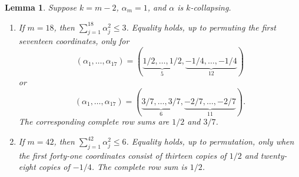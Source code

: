 \documentclass[10pt]{article}
\newtheorem{lemma}{Lemma}
\begin{document}
\begin{lemma}\label{lem:scalar}
Suppose $k=m-2$, $\alpha_m=1$, and $\alpha$ is $k$-collapsing.
\begin{enumerate}
\item If $m=18$, then $\sum_{j=1}^{18}\alpha_j^2\le3$. Equality holds,
up to permuting the first seventeen coordinates, only for
\[
 (\alpha_1,\ldots,\alpha_{17})
 = (\underbrace{1/2,\ldots,1/2}_{5},
    \underbrace{-1/4,\ldots,-1/4}_{12})
\]
or
\[
 (\alpha_1,\ldots,\alpha_{17})
 = (\underbrace{3/7,\ldots,3/7}_{6},
    \underbrace{-2/7,\ldots,-2/7}_{11}).
\]
The corresponding complete row sums are $1/2$ and $3/7$.
\item If $m=42$, then $\sum_{j=1}^{42}\alpha_j^2\le6$. Equality holds,
up to permutation, only when the first forty-one coordinates consist of
thirteen copies of $1/2$ and twenty-eight copies of $-1/4$. The complete row
sum is $1/2$.
\end{enumerate}
\end{lemma}
\end{document}
